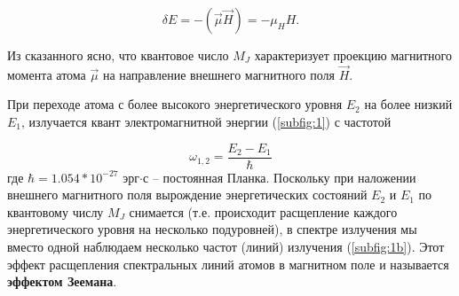 \begin{equation}
\delta E=-(\overrightarrow{\mu}\overrightarrow{H})=-\mu_HH.
\label{eq:2}
\end{equation}

Из сказанного ясно, что квантовое число $M_J$ характеризует проекцию магнитного момента атома $\vec{\mu}$ на направление внешнего магнитного поля $\overrightarrow{H}$.


При переходе атома с более высокого энергетического уровня $E_2$ на более низкий $E_1$, излучается квант электромагнитной энергии (\ref{subfig:1}) с частотой

\begin{equation}
\omega_{1,2}=\frac{E_2-E_1}{\hbar}
\label{eq:3}
\end{equation}
где $\hbar = 1.054*10^{-27}$ эрг$\cdot$с -- постоянная Планка. Поскольку при наложении внешнего магнитного поля вырождение энергетических состояний $E_2$ и $E_1$ по квантовому числу $M_J$ снимается (т.е. происходит расщепление каждого энергетического уровня на несколько подуровней), в спектре излучения мы вместо одной наблюдаем несколько частот (линий) излучения (\ref{subfig:1b}). Этот эффект расщепления спектральных линий атомов в магнитном поле и называется \textbf{эффектом Зеемана}.
